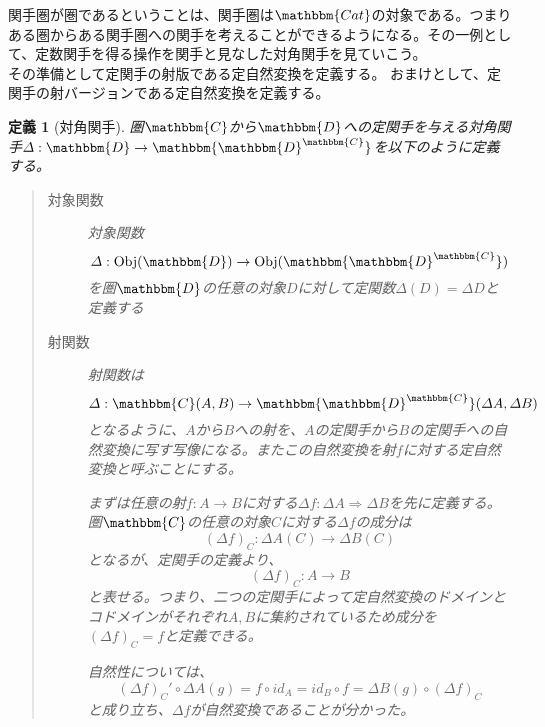 \documentclass[uplatex,dvipdfmx]{jsarticle}
\newcommand{\cat}[1]{\mathbbm{#1}}
\newcommand{\arrow}{\rightarrow}
\newcommand{\functor}[3]{#1:\cat{#2}\arrow \cat{#3}}
\newcommand{\nat}[3]{#1:#2\Rightarrow #3}
\newcommand{\obj}[1]{\mathrm{Obj}(\cat{#1})}
\newcommand{\mor}[3]{#1:#2\arrow #3}
\newcommand{\arset}[3]{\cat{#1}(#2,#3)}
\newcommand{\funccat}[2]{\cat{#2}^\cat{#1}}
\newtheorem{define}{定義}[section]
\numberwithin{proof}{subsection}
\numberwithin{prop}{subsection}
\numberwithin{define}{subsection}
\begin{document}
  関手圏が圏であるということは、関手圏は$\cat{Cat}$の対象である。つまりある圏からある関手圏への関手を考えることができるようになる。その一例として、定数関手を得る操作を関手と見なした対角関手を見ていこう。\\
  その準備として定関手の射版である定自然変換を定義する。
  おまけとして、定関手の射バージョンである定自然変換を定義する。
  \begin{define}[対角関手]
    圏$\cat{C}$から$\cat{D}$への定関手を与える対角関手$\functor{\varDelta}{D}{\funccat{C}{D}}$を以下のように定義する。
    \begin{quote}
			\begin{description}
				\item[対象関数] 対象関数\[\mor{\varDelta}{\obj{D}}{\obj{\funccat{C}{D}}}\]
				を圏$\cat{D}$の任意の対象$D$に対して定関数$\varDelta(D)=\varDelta D$と定義する 
				\item[射関数] 
        射関数は\[\mor{\varDelta}{\arset{C}{A}{B}}{\arset{\funccat{C}{D}}{\varDelta A}{\varDelta B}}\]となるように、$A$から$B$への射を、$A$の定関手から$B$の定関手への自然変換に写す写像になる。またこの自然変換を射$f$に対する定自然変換と呼ぶことにする。

        まずは任意の射$\mor{f}{A}{B}$に対する$\nat{\varDelta f}{\varDelta A}{\varDelta B}$を先に定義する。
        圏$\cat{C}$の任意の対象$C$に対する$\varDelta f$の成分は\[\mor{(\varDelta f)_C}{\varDelta A(C)}{\varDelta B(C)}\]となるが、定関手の定義より、\[\mor{(\varDelta f)_C}{A}{B}\]と表せる。つまり、二つの定関手によって定自然変換のドメインとコドメインがそれぞれ$A,B$に集約されているため成分を$(\varDelta f)_C=f$と定義できる。

        自然性については、\[(\varDelta f)_C'\circ\varDelta A(g)=f\circ id_A=id_B\circ f=\varDelta B(g)\circ(\varDelta f)_C\]と成り立ち、$\varDelta f$が自然変換であることが分かった。

        \begin{center}
\end{center}
\end{description}
\end{quote}
\end{define}
\end{document}
